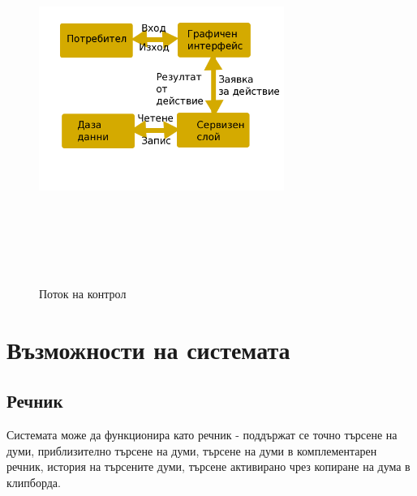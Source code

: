 \begin{figure}[htbp]
  \caption{Поток на контрол}
  \centering
  \includegraphics[width=80mm, height=120mm]{images/flow.png}
\end{figure}
\section{Възможности на системата}
\subsection{Речник}
Системата може да функционира като речник - поддържат се точно търсене
на думи, приблизително търсене на думи, търсене на думи в
комплементарен речник, история на търсените думи, търсене активирано
чрез копиране на дума в клипборда. 

